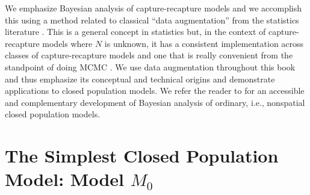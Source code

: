 


We emphasize Bayesian analysis of capture-recapture models and we
accomplish this using a method related to classical ``data
augmentation'' from the statistics literature
\citep[e.g.,][]{tanner_wong:1987}.  This is a general concept in
statistics but, in the context of capture-recapture models where $N$
is unknown, it has a consistent implementation across classes of
capture-recapture models and one that is really convenient from the
standpoint of doing MCMC
\citep{royle_etal:2007,royle_dorazio:2012}. We use data augmentation
throughout this book and thus emphasize its conceptual and technical
origins and demonstrate applications to closed population models.  We
refer the reader to \citet[][ch. 6]{kery_schaub:2011} for an
accessible and complementary development of Bayesian analysis of
ordinary, i.e., nonspatial closed population models.


\section{The Simplest Closed Population Model: Model $M_0$}

